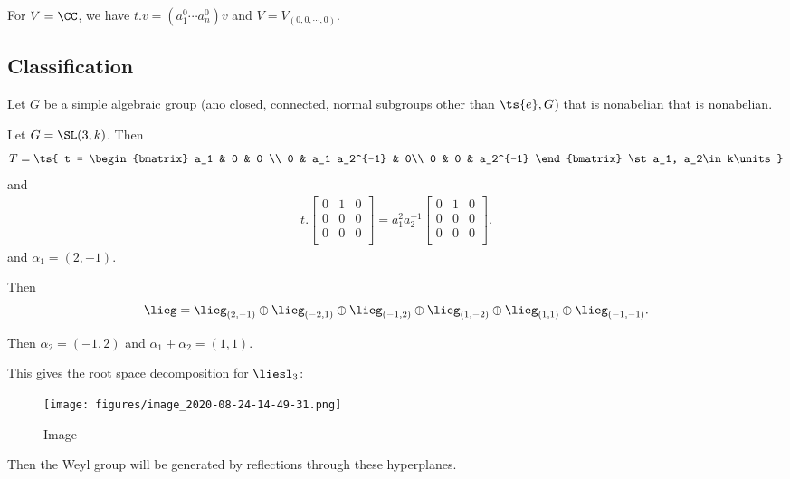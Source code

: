 \begin{example}

For \(V = \CC\), we have \(t.v = (a_1^0 \cdots a_n^0)v\) and
\(V = V_{(0, 0, \cdots, 0)}\).

\end{example}

\hypertarget{classification}{%
\subsection{Classification}\label{classification}}

Let \(G\) be a simple algebraic group (ano closed, connected, normal
subgroups other than \(\ts{e}, G\)) that is nonabelian that is
nonabelian.

\begin{example}

Let \(G = \SL(3, k)\). Then
\begin{align*}  
T = \ts{
t = 
\begin{bmatrix}
a_1 & 0 & 0 \\
0 & a_1 a_2^{-1}  & 0\\
0 & 0 & a_2^{-1} 
\end{bmatrix}
\st
a_1, a_2\in k\units
}
\end{align*} and
\begin{align*}  
t.
\begin{bmatrix}
0 & 1 & 0 \\
0 & 0 & 0 \\
0 & 0 & 0 \\
\end{bmatrix}
= 
a_1^2 a_2^{-1} 
\begin{bmatrix}
0 & 1 & 0 \\
0 & 0 & 0 \\
0 & 0 & 0 \\
\end{bmatrix}
.\end{align*} and \(\alpha_1 = (2, -1)\).


Then
\begin{align*}  
\lieg = 
\lieg_{(2, -1)} \oplus \lieg_{(-2, 1)} \oplus
\lieg_{(-1, 2)} \oplus \lieg_{(1, -2)} \oplus
\lieg_{(1, 1)} \oplus \lieg_{(-1, -1)}
.\end{align*}

Then \(\alpha_2 = (-1, 2)\) and \(\alpha_1 + \alpha_2 = ( 1, 1)\).

This gives the root space decomposition for \(\liesl_3\):

\begin{figure}
\centering
\texttt{[image: figures/image\_2020-08-24-14-49-31.png]}
\caption{Image}
\end{figure}

Then the Weyl group will be generated by reflections through these
hyperplanes.

\end{example}

